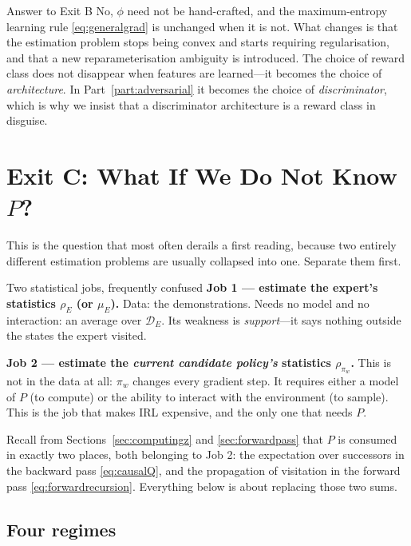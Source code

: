 \documentclass[11pt]{article}
\theoremstyle{plain}
\theoremstyle{definition}
\theoremstyle{remark}
\begin{document}
\begin{graybox}{Answer to Exit B}
No, $\phi$ need not be hand-crafted, and the maximum-entropy learning rule
\eqref{eq:generalgrad} is unchanged when it is not. What changes is that
the estimation problem stops being convex and starts requiring
regularisation, and that a new reparameterisation ambiguity is
introduced. The choice of reward class does not disappear when features
are learned---it becomes the choice of \emph{architecture}. In
Part~\ref{part:adversarial} it becomes the choice of \emph{discriminator},
which is why we insist that a discriminator architecture is a reward
class in disguise.
\end{graybox}

\section{Exit C: What If We Do Not Know $P$?}
\label{sec:exitc}

This is the question that most often derails a first reading, because two
entirely different estimation problems are usually collapsed into one.
Separate them first.

\begin{graybox}{Two statistical jobs, frequently confused}
\textbf{Job 1 --- estimate the expert's statistics $\rho_E$ (or $\mu_E$).}
Data: the demonstrations. Needs no model and no interaction: an average
over $\mathcal{D}_E$. Its weakness is \emph{support}---it says nothing
outside the states the expert visited.

\medskip
\textbf{Job 2 --- estimate the \emph{current candidate policy's}
statistics $\rho_{\pi_w}$.}
This is not in the data at all: $\pi_w$ changes every gradient step. It
requires either a model of $P$ (to compute) or the ability to interact
with the environment (to sample). This is the job that makes IRL
expensive, and the only one that needs $P$.
\end{graybox}

Recall from Sections~\ref{sec:computingz} and \ref{sec:forwardpass} that
$P$ is consumed in exactly two places, both belonging to Job 2: the
expectation over successors in the backward pass \eqref{eq:causalQ}, and
the propagation of visitation in the forward pass
\eqref{eq:forwardrecursion}. Everything below is about replacing those two
sums.

\subsection{Four regimes}
\end{document}
